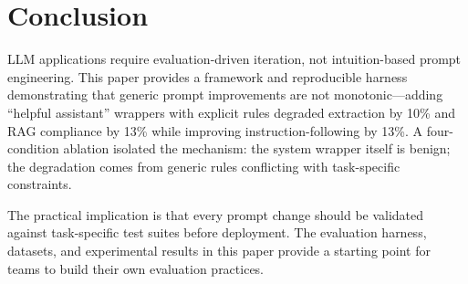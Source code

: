 
\section{Conclusion}
\label{sec:conclusion}

LLM applications require evaluation-driven iteration, not intuition-based prompt engineering. This paper provides a framework and reproducible harness demonstrating that generic prompt improvements are not monotonic---adding ``helpful assistant'' wrappers with explicit rules degraded extraction by 10\% and RAG compliance by 13\% while improving instruction-following by 13\%. A four-condition ablation isolated the mechanism: the system wrapper itself is benign; the degradation comes from generic rules conflicting with task-specific constraints.

The practical implication is that every prompt change should be validated against task-specific test suites before deployment. The evaluation harness, datasets, and experimental results in this paper provide a starting point for teams to build their own evaluation practices.
